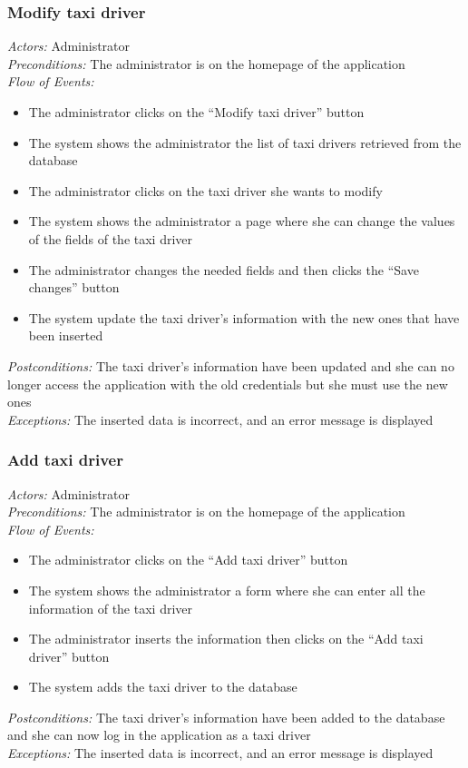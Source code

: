 \documentclass{article}
\begin{document}
\subsubsection{Modify taxi driver}
\textit{Actors:} Administrator
\\\textit{Preconditions:} The administrator is on the homepage of the application
\\\textit{Flow of Events:}
\begin{itemize}
	\item  The administrator clicks on the ``Modify taxi driver'' button
	\item  The system shows the administrator the list of taxi drivers retrieved from the database
	\item  The administrator clicks on the taxi driver she wants to modify
	\item  The system shows the administrator a page where she can change the values of the fields of the taxi driver
	\item  The administrator changes the needed fields and then clicks the ``Save changes'' button
	\item  The system update the taxi driver's information with the new ones that have been inserted
\end{itemize}
\textit{Postconditions:} The taxi driver's information have been updated and she can no longer access the application with the old credentials but she must use the new ones
\\\textit{Exceptions:} The inserted data is incorrect, and an error message is displayed 

\subsubsection{Add taxi driver}
\textit{Actors:} Administrator
\\\textit{Preconditions:} The administrator is on the homepage of the application
\\\textit{Flow of Events:}
\begin{itemize}
	\item  The administrator clicks on the ``Add taxi driver'' button
	\item  The system shows the administrator a form where she can enter all the information of the taxi driver %
	\item  The administrator inserts the information then clicks on the ``Add taxi driver'' button
	\item  The system adds the taxi driver to the database
\end{itemize}
\textit{Postconditions:} The taxi driver's information have been added to the database and she can now log in the application as a taxi driver
\\\textit{Exceptions:} The inserted data is incorrect, and an error message is displayed 
\end{document}
